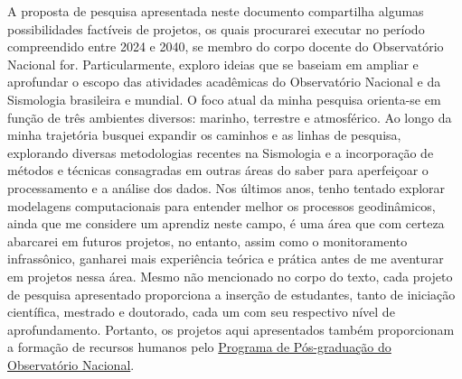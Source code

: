 \documentclass[10pt,a4paper,oneside]{book}
\begin{document}
A proposta de pesquisa apresentada neste documento compartilha algumas possibilidades factíveis de projetos, os quais procurarei executar no período compreendido entre 2024 e 2040, se membro do corpo docente do Observatório Nacional for. Particularmente, exploro ideias que se baseiam em ampliar e aprofundar o escopo das atividades acadêmicas do Observatório Nacional e da Sismologia brasileira e mundial. O foco atual da minha pesquisa orienta-se em função de três ambientes diversos: marinho, terrestre e atmosférico. Ao longo da minha trajetória busquei expandir os caminhos e as linhas de pesquisa, explorando diversas metodologias recentes na Sismologia e a incorporação de métodos e técnicas consagradas em outras áreas do saber para aperfeiçoar o processamento e a análise dos dados. Nos últimos anos, tenho tentado explorar modelagens computacionais para entender melhor os processos geodinâmicos, ainda que me considere um aprendiz neste campo, é uma área que com certeza abarcarei em futuros projetos, no entanto, assim como o monitoramento infrassônico, ganharei mais experiência teórica e prática antes de me aventurar em projetos nessa área. Mesmo não mencionado no corpo do texto, cada projeto de pesquisa apresentado proporciona a inserção de estudantes, tanto  de iniciação científica, mestrado e doutorado, cada um com seu respectivo nível de aprofundamento. Portanto, os projetos aqui apresentados também proporcionam a formação de recursos humanos pelo \href{https://www.gov.br/observatorio/pt-br/assuntos/programas-academicos/pos-graduacao-em-geofisica}{Programa de Pós-graduação do Observatório Nacional}.
\end{document}
